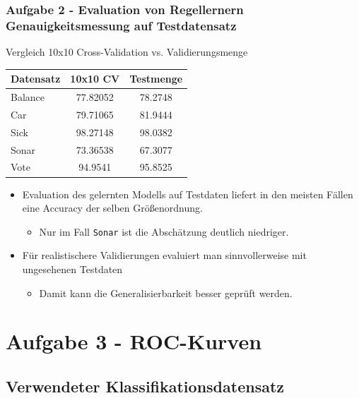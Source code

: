 \documentclass[accentcolor=tud6b,colorbacktitle,inverttitle,landscape,german,presentation,t]{tudbeamer}
\begin{document}
    \begin{frame}[t]
    \frametitle{Aufgabe 2 - Evaluation von Regellernern\\ Genauigkeitsmessung auf Testdatensatz}
        Vergleich 10x10 Cross-Validation vs. Validierungsmenge
        \vfill
        \begin{tabular}[htbp]{l||c|c}
            Datensatz & 10x10 CV & Testmenge \\
            \hline
            \hline
            Balance & 77.82052 & 78.2748 \\
            \hline
            Car & 79.71065 & 81.9444 \\
            \hline
            Sick & 98.27148 & 98.0382 \\
            \hline
            Sonar & 73.36538 & 67.3077 \\
            \hline
            Vote & 94.9541 & 95.8525 \\
        \end{tabular}
        \vfill
         \begin{itemize}
            \item  Evaluation des gelernten Modells auf Testdaten liefert in den meisten Fällen eine Accuracy der selben Größenordnung.
            \begin{itemize}
         		\item  Nur im Fall \texttt{Sonar} ist die Abschätzung deutlich niedriger.		
	\end{itemize} 
	\item Für realistischere Validierungen evaluiert man sinnvollerweise mit ungesehenen Testdaten
	\begin{itemize}
         		\item  Damit kann die Generalisierbarkeit besser geprüft werden.	 		
	\end{itemize}  
         \end{itemize}   
    \end{frame}
    
    \section{Aufgabe 3 - ROC-Kurven}
    
    \subsection{Verwendeter Klassifikationsdatensatz}
    
\end{document}
